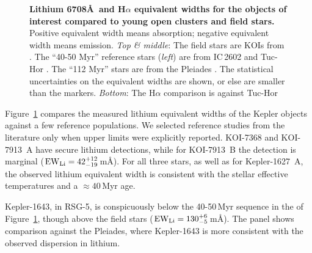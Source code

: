 \documentclass[12pt,twocolumn,tighten,linenumbers]{aastex63}
\begin{document}
\begin{figure}[tp]
\begin{center}
		\vspace{-0.35cm}
	\end{center}
	\vspace{-0.6cm}
	\caption{
    {\bf Lithium 6708\AA\ and H$\alpha$ equivalent widths for the
    objects of interest compared to young open clusters and field
    stars. } Positive equivalent width means absorption; negative
    equivalent width means emission.  
    {\it Top \& middle}:
    The field stars are KOIs from
    \citet{berger_identifying_2018}.  The ``40-50 Myr'' reference
    stars ({\it left}) are from IC\,2602  and
    Tuc-Hor \citep{kraus_stellar_2014}.  The ``112 Myr'' stars
    are from the Pleiades
    \citep{soderblom_evolution_1993,jones_evolution_1996,bouvier_pleiades_lirot_2018}.
    The statistical uncertainties on
    the equivalent widths are shown, or else are
    smaller than the markers.
    {\it Bottom}:
    The H$\alpha$ comparison is against Tuc-Hor
    \citep[$\approx$$40$\,Myr;][]{kraus_stellar_2014}
    \label{fig:lithium}
	}
\end{figure}

Figure~\ref{fig:lithium} compares the measured lithium equivalent
widths of the Kepler objects against a few reference populations.  We
selected reference studies from the literature only when upper limits were
explicitly reported.  KOI-7368 and KOI-7913~A have secure lithium
detections, while for KOI-7913~B the detection is marginal (${\rm EW}_{\rm
Li} = 42^{+12}_{-19}$\,m\AA).  For all three stars, as well as for
Kepler-1627~A, the observed lithium equivalent width is consistent
with the stellar effective temperatures and a $\approx40$\,Myr age.

Kepler-1643, in RSG-5, is conspicuously below the 40-50$\,$Myr
sequence in the  of Figure~\ref{fig:lithium}, though
above the field stars (${\rm EW}_{\rm Li} = 130^{+6}_{-5}$\,m\AA).
The  panel shows  comparison against the Pleiades, where
Kepler-1643 is more consistent with the observed dispersion in
lithium.
\end{document}
